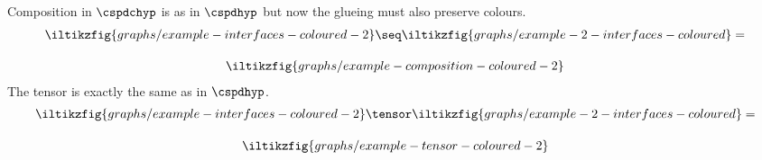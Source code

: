 \begin{example}
    Composition in \(\cspdchyp\) is as in \(\cspdhyp\) but now the glueing
    must also preserve colours.
    \begin{gather*}
        \iltikzfig{graphs/example-interfaces-coloured-2}
        \seq
        \iltikzfig{graphs/example-2-interfaces-coloured}
        =\\[1em]
        \iltikzfig{graphs/example-composition-coloured-2}
    \end{gather*}
    The tensor is exactly the same as in \(\cspdhyp\).
    \begin{gather*}
        \iltikzfig{graphs/example-interfaces-coloured-2}
        \tensor
        \iltikzfig{graphs/example-2-interfaces-coloured}
        =\\[1em]
        \iltikzfig{graphs/example-tensor-coloured-2}
    \end{gather*}
\end{example}